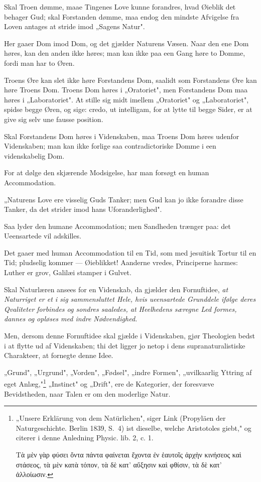 \documentclass[12pt,a4paper]{article}
\newcommand{\opage}[1]{\marginnote{\footnotesize\textit{[#1]}}}
\begin{document}
Skal Troen dømme, maae Tingenes Love kunne forandres, hvad Øieblik det behager
Gud; skal Forstanden dømme, maa endog den mindste Afvigelse fra Loven antages at
stride imod „Sagens Natur".

Her gaaer Dom imod Dom, og det gjælder Naturens Væsen. Naar den ene Dom høres,
kan den anden ikke høres; man kan ikke paa een Gang høre to Domme, fordi man har
to Øren.

Troens Øre kan slet ikke høre Forstandens Dom, saalidt som Forstandens Øre kan
høre Troens Dom. Troens Dom høres i „Oratoriet", men Forstandens Dom maa høres i
„Laboratoriet". At stille sig midt imellem „Oratoriet" og „Laboratoriet", spidse
begge Øren, og sige: credo, ut intelligam, for at lytte til begge Sider, er at
give sig selv une fausse position.

Skal Forstandens Dom høres i Videnskaben, maa Troens Dom høres udenfor
Videnskaben; man kan ikke forlige saa contradictoriske Domme i een videnskabelig
Dom.

For at dølge den skjærende Modsigelse, har man forsøgt en human Accommodation.

„Naturens Love ere visselig Guds Tanker; men Gud kan jo ikke forandre disse
Tanker, da det strider imod hans Uforanderlighed".

Saa lyder den humane Accommodation; men Sandheden trænger paa: det Ueensartede
vil adskilles.

Det gaaer med human Accommodation til en Tid, som med jesuitisk
\opage{34} Tortur til en Tid; pludselig kommer --- Øieblikket! Aanderne vredes, Principerne
harmes: Luther er grov, Galilæi stamper i Gulvet.

Skal Naturlæren ansees for en Videnskab, da gjælder den Fornuftidee, \emph{at
Naturriget er et i sig sammensluttet Hele, hvis ueensartede Grunddele ifølge
deres Qvaliteter forbindes og sondres saaledes, at Heelhedens særegne Led formes,
dannes og opløses med indre Nødvendighed.}

Men, dersom denne Fornuftidee skal gjælde i Videnskaben, gjør Theologien bedst i
at flytte ud af Videnskaben; thi det ligger jo netop i dens supranaturalistiske
Charakteer, at fornegte denne Idee.

„Grund", „Urgrund", „Vorden", „Fødsel", „indre Formen", „uvilkaarlig Yttring af
eget Anlæg,"\footnote{„Unsere Erklärung von dem Natürlichen", siger Link
(Propyläen der Naturgeschichte. Berlin 1839, S.~4) ist dieselbe, welche
Aristotoles giebt," og citerer i denne Anledning Physic. lib. 2, c. 1.

Τὰ μὲν γὰρ φύσει ὄντα πάντα φαίνεται ἔχοντα ἐν ἑαυτοῖς ἀρχὴν κινήσεος καὶ στάσεος,
τὰ μὲν κατὰ τόπον, τὰ δὲ κατ' αὔξησιν καὶ φθίσιν, τὰ δὲ κατ' ἀλλοίωσιν.} „Instinct"
og „Drift", ere de Kategorier, der foresvæve Bevidstheden, naar Talen er om den
moderlige Natur.
\end{document}

